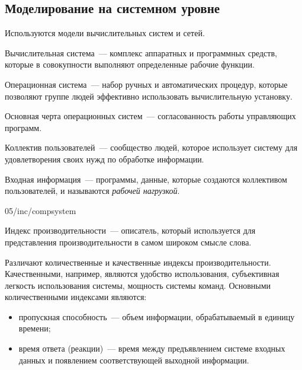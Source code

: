 \subsection{Моделирование на системном уровне}

Используются модели вычислительных систем и сетей.

\begin{dd}
    Вычислительная система~--- комплекс аппаратных и программных средств, которые в совокупности выполняют определенные рабочие функции.
\end{dd}

\begin{dd}
    Операционная система~--- набор ручных и автоматических процедур, которые позволяют группе людей эффективно использовать вычислительную установку.
\end{dd}

Основная черта операционных систем~--- согласованность работы управляющих программ.

\begin{dd}
    Коллектив пользователей~--- сообщество людей, которое использует систему для удовлетворения своих нужд по обработке информации.
\end{dd}

\begin{dd}
    Входная информация~--- программы, данные, которые создаются коллективом пользователей, и называются \textit{рабочей нагрузкой}.
\end{dd}

\image
{\textwidth}
{05/inc/compsystem}
{}

\begin{dd}
    Индекс производительности~--- описатель, который используется для представления производительности в самом широком смысле слова.
\end{dd}

Различают количественные и качественные индексы производительности. Качественными, например, являются удобство использования, субъективная легкость использования системы, мощность системы команд. Основными количественными индексами являются:

\begin{itemize}
    \item пропускная способность~--- объем информации, обрабатываемый в единицу времени;
    \item время ответа (реакции)~--- время между предъявлением системе входных данных и появлением соответствующей выходной информации.
\end{itemize}

